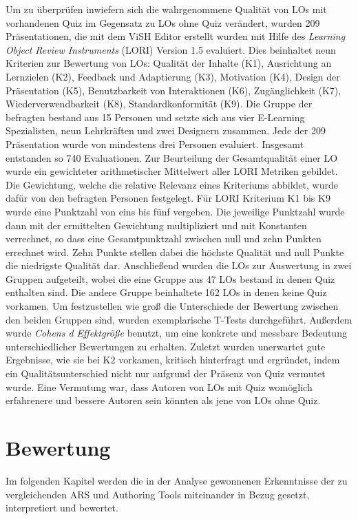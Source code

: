 \documentclass[conference]{IEEEtran}
\begin{document}
Um zu überprüfen inwiefern sich die wahrgenommene Qualität von LOs mit vorhandenen Quiz im Gegensatz zu LOs ohne Quiz verändert, wurden 209 Präsentationen, die mit dem ViSH Editor erstellt wurden mit Hilfe des \emph{Learning Object Review Instruments} (LORI) Version 1.5\cite{Leacock2007} evaluiert. Dies beinhaltet neun Kriterien zur Bewertung von LOs: Qualität der Inhalte (K1), Ausrichtung an Lernzielen (K2), Feedback und Adaptierung (K3), Motivation (K4), Design der Präsentation (K5), Benutzbarkeit von Interaktionen (K6), Zugänglichkeit (K7), Wiederverwendbarkeit (K8), Standardkonformität (K9). Die Gruppe der befragten bestand aus 15 Personen und setzte sich aus vier E-Learning Spezialisten, neun Lehrkräften und zwei Designern zusammen. Jede der 209 Präsentation wurde von mindestens drei Personen evaluiert. Insgesamt entstanden so 740 Evaluationen. Zur Beurteilung der Gesamtqualität einer LO wurde ein gewichteter arithmetischer Mittelwert aller LORI Metriken gebildet. Die Gewichtung, welche die relative Relevanz eines Kriteriums abbildet, wurde dafür von den befragten Personen festgelegt. Für LORI Kriterium K1 bis K9 wurde eine Punktzahl von eins bis fünf vergeben. Die jeweilige Punktzahl wurde dann mit der ermittelten Gewichtung multipliziert und mit Konstanten verrechnet, so dass eine Gesamtpunktzahl zwischen null und zehn Punkten errechnet wird. Zehn Punkte stellen dabei die höchste Qualität und null Punkte die niedrigste Qualität dar. Anschließend wurden die LOs zur Auswertung in zwei Gruppen aufgeteilt, wobei die eine Gruppe aus 47 LOs bestand in denen Quiz enthalten sind. Die andere Gruppe beinhaltete 162 LOs in denen keine Quiz vorkamen. Um festzustellen wie groß die Unterschiede der Bewertung zwischen den beiden Gruppen sind, wurden exemplarische T-Tests durchgeführt. Außerdem wurde \emph{Cohens d Effektgröße} \cite{CohenJ1992} benutzt, um eine konkrete und messbare Bedeutung unterschiedlicher Bewertungen zu erhalten. Zuletzt wurden unerwartet gute Ergebnisse, wie sie bei K2 vorkamen, kritisch hinterfragt und ergründet, indem ein Qualitätsunterschied nicht nur aufgrund der Präsenz von Quiz vermutet wurde. Eine Vermutung war, dass Autoren von LOs mit Quiz womöglich erfahrenere und bessere Autoren sein könnten als jene von LOs ohne Quiz.

\section{Bewertung}
Im folgenden Kapitel werden die in der Analyse gewonnenen Erkenntnisse der zu vergleichenden ARS und Authoring Tools miteinander in Bezug gesetzt, interpretiert und bewertet.
\end{document}

